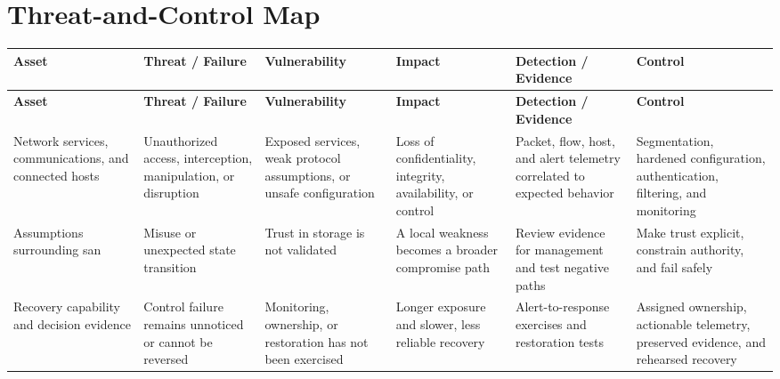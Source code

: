 \documentclass[11pt,letterpaper]{article}
\begin{document}
\section*{Threat-and-Control Map}
\begingroup\scriptsize\setlength{\tabcolsep}{2pt}
\begin{longtable}{>{\raggedright\arraybackslash}p{}>{\raggedright\arraybackslash}p{}>{\raggedright\arraybackslash}p{}>{\raggedright\arraybackslash}p{}>{\raggedright\arraybackslash}p{}>{\raggedright\arraybackslash}p{}}
\toprule\rowcolor{Navy}\color{white}\textbf{Asset} & \color{white}\textbf{Threat / Failure} & \color{white}\textbf{Vulnerability} & \color{white}\textbf{Impact} & \color{white}\textbf{Detection / Evidence} & \color{white}\textbf{Control}\\\midrule
\endfirsthead
\toprule\rowcolor{Navy}\color{white}\textbf{Asset} & \color{white}\textbf{Threat / Failure} & \color{white}\textbf{Vulnerability} & \color{white}\textbf{Impact} & \color{white}\textbf{Detection / Evidence} & \color{white}\textbf{Control}\\\midrule
\endhead
Network services, communications, and connected hosts & Unauthorized access, interception, manipulation, or disruption & Exposed services, weak protocol assumptions, or unsafe configuration & Loss of confidentiality, integrity, availability, or control & Packet, flow, host, and alert telemetry correlated to expected behavior & Segmentation, hardened configuration, authentication, filtering, and monitoring\\\midrule
Assumptions surrounding san & Misuse or unexpected state transition & Trust in storage is not validated & A local weakness becomes a broader compromise path & Review evidence for management and test negative paths & Make trust explicit, constrain authority, and fail safely\\\midrule
Recovery capability and decision evidence & Control failure remains unnoticed or cannot be reversed & Monitoring, ownership, or restoration has not been exercised & Longer exposure and slower, less reliable recovery & Alert-to-response exercises and restoration tests & Assigned ownership, actionable telemetry, preserved evidence, and rehearsed recovery\\\midrule
\bottomrule
\end{longtable}
\endgroup
\end{document}
